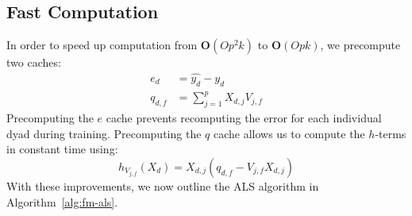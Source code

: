 \documentclass[10pt]{journal}
\begin{document}
\subsection{Fast Computation}

In order to speed up computation from $\bm{O}(Op^2k)$ to $\bm{O}(Opk)$, we
precompute two caches:
%
\begin{align}
    e_d &= \hat{y_d} - y_d  \\
    q_{d,f} &= \sum_{j=1}^p X_{d,j} V_{j,f}
\end{align}
%
Precomputing the $e$ cache prevents recomputing the error for each individual
dyad during training. Precomputing the $q$ cache allows us to compute the
$h$-terms in constant time using:
%
\begin{equation}
    h_{V_{j,f}}(X_d) = X_{d,j} (q_{d,f} - V_{j,f} X_{d,j})
\end{equation}
%
With these improvements, we now outline the ALS algorithm in
Algorithm~\ref{alg:fm-als}.
\end{document}
